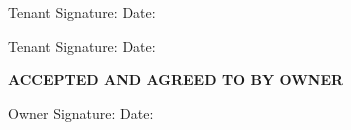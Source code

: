 \documentclass[9pt, letterpaper, oneside]{extarticle}
\begin{document}
 Tenant Signature: \hspace{5mm} \underline{\hspace{90mm}} \hspace{10mm} Date: \hspace{5mm} \underline{\hspace{40mm}}

 \vspace{10mm}

 Tenant Signature: \hspace{5mm} \underline{\hspace{90mm}} \hspace{10mm} Date: \hspace{5mm} \underline{\hspace{40mm}}

 \vspace{10mm}

 \textbf{ACCEPTED AND AGREED TO BY OWNER}

 \vspace{10mm} 
 Owner Signature: \hspace{5mm} \underline{\hspace{90mm}} \hspace{10mm} Date: \hspace{5mm} \underline{\hspace{40mm}}

 
\end{document}
